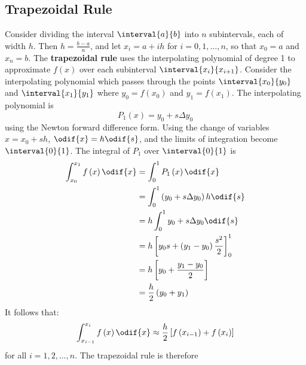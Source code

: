 \documentclass{article}
\begin{document}
\subsection{Trapezoidal Rule}
Consider dividing the interval \(\interval{a}{b}\) into \(n\)
subintervals, each of width \(h\). Then \(h = \frac{b - a}{n}\), and
let \(x_i = a + ih\) for \(i = 0, 1, \ldots, n\), so that \(x_0 = a\)
and \(x_n = b\). The \textbf{trapezoidal rule} uses the interpolating
polynomial of degree 1 to approximate \(f\left( x \right)\) over each
subinterval \(\interval{x_i}{x_{i + 1}}\). Consider the interpolating
polynomial which passes through the points \(\interval{x_0}{y_0}\) and
\(\interval{x_1}{y_1}\) where \(y_0 = f\left( x_0 \right)\) and \(y_1 =
f\left( x_1 \right)\). The interpolating polynomial is
\begin{equation*}
    P_1\left( x \right) = y_0 + s \Delta{y_0}
\end{equation*}
using the Newton forward difference form. Using the change of variables
\(x = x_0 + s h\), \(\odif{x} = h \odif{s}\), and the limits of
integration become \(\interval{0}{1}\). The integral of \(P_1\) over
\(\interval{0}{1}\) is
\begin{align*}
    \int_{x_0}^{x_1} f\left( x \right) \odif{x} & = \int_0^1 P_1\left( x \right) \odif{x}                               \\
                                                & = \int_0^1 \left( y_0 + s \Delta{y_0} \right) h \odif{s}              \\
                                                & = h \int_0^1 y_0 + s \Delta{y_0} \odif{s}                             \\
                                                & = h \left[ y_0 s + \left( y_1 - y_0 \right) \frac{s^2}{2} \right]_0^1 \\
                                                & = h \left[ y_0 + \frac{y_1 - y_0}{2} \right]                          \\
                                                & = \frac{h}{2} \left( y_0 + y_1 \right)
\end{align*}
It follows that:
\begin{equation*}
    \int_{x_{i - 1}}^{x_i} f\left( x \right) \odif{x} \approx \frac{h}{2} \left[ f\left( x_{i - 1} \right) + f\left( x_i \right) \right]
\end{equation*}
for all \(i = 1, 2, \ldots, n\). The trapezoidal rule is therefore
\end{document}
